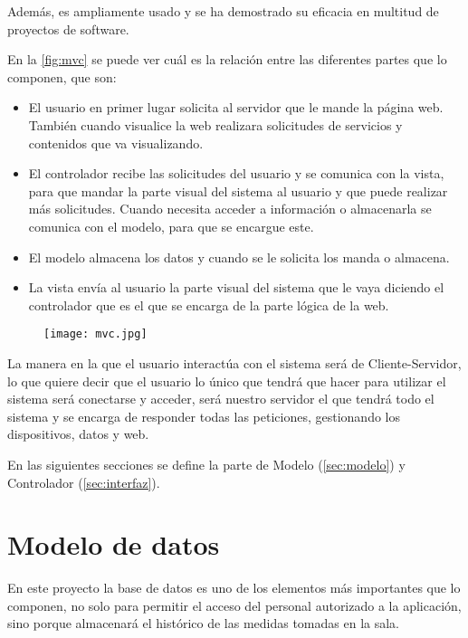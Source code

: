 Además, es ampliamente usado y se ha demostrado su eficacia en multitud de proyectos de software.
\pagebreak

En la \autoref{fig:mvc} se puede ver cuál es la relación entre las diferentes partes que lo componen, que son:
\begin{itemize}
    \item El usuario en primer lugar solicita al servidor que le mande la página web. También cuando visualice la web realizara solicitudes de servicios y contenidos que va visualizando.
    \item El controlador recibe las solicitudes del usuario y se comunica con la vista, para que mandar la parte visual del sistema al usuario y que puede realizar más solicitudes. Cuando necesita acceder a información o almacenarla se comunica con el modelo, para que se encargue este.
    \item El modelo almacena los datos y cuando se le solicita los manda o almacena.
    \item La vista envía al usuario la parte visual del sistema que le vaya diciendo el controlador que es el que se encarga de la parte lógica de la web.
\end{itemize}

\begin{figure}[H]
	{\texttt{[image: mvc.jpg]}}
\end{figure}

La manera en la que el usuario interactúa con el sistema será de Cliente-Servidor, lo que quiere decir que el usuario lo único que tendrá que hacer para utilizar el sistema será conectarse y acceder, será nuestro servidor el que tendrá todo el sistema y se encarga de responder todas las peticiones, gestionando los dispositivos, datos y web. 

En las siguientes secciones se define la parte de Modelo (\autoref{sec:modelo}) y Controlador (\autoref{sec:interfaz}).
\pagebreak

\section{Modelo de datos}\label{sec:modelo}
En este proyecto la base de datos es uno de los elementos más importantes que lo componen, no solo para permitir el acceso del personal autorizado a la aplicación, sino porque almacenará el histórico de las medidas tomadas en la sala.

